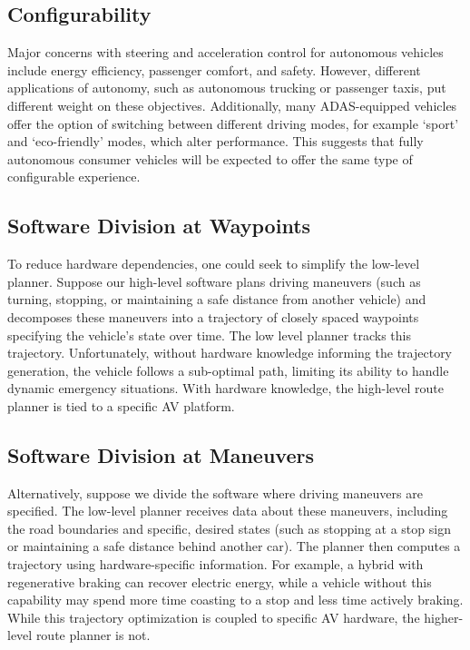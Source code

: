 \documentclass[letterpaper, 10 pt, conference]{ieeeconf}  %
\begin{document}
\subsection{Configurability}
Major concerns with steering and acceleration control for autonomous vehicles include energy efficiency, passenger comfort, and safety. However, different applications of autonomy, such as autonomous trucking or passenger taxis, put different weight on these objectives.
Additionally, many ADAS-equipped vehicles offer the option of switching between different driving modes, for example `sport' and `eco-friendly' modes, which alter performance. This suggests that fully autonomous consumer vehicles will be expected to offer the same type of configurable experience.

\subsection{Software Division at Waypoints}

To reduce hardware dependencies, one could seek to simplify the low-level planner. Suppose our high-level software plans driving maneuvers (such as turning, stopping, or maintaining a safe distance from another vehicle) and decomposes these maneuvers into a trajectory of closely spaced waypoints specifying the vehicle's state over time. The low level planner tracks this trajectory. Unfortunately, without hardware knowledge informing the trajectory generation, the vehicle follows a sub-optimal path, limiting its ability to handle dynamic emergency situations. With hardware knowledge, the high-level route planner is tied to a specific AV platform.

\subsection{Software Division at Maneuvers} Alternatively, suppose we divide the software where driving maneuvers are specified. The low-level planner receives data about these maneuvers, including the road boundaries and specific, desired states (such as stopping at a stop sign or maintaining a safe distance behind another car). The planner then computes a trajectory using hardware-specific information. For example, a hybrid with regenerative braking can recover electric energy, while a vehicle without this capability may spend more time coasting to a stop and less time actively braking. While this trajectory optimization is coupled to specific AV hardware, the higher-level route planner is not.
\end{document}
